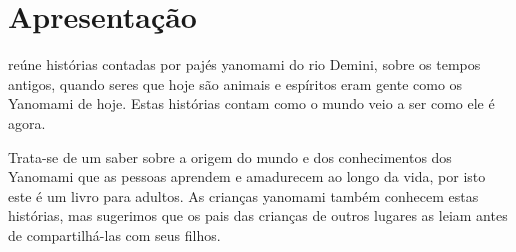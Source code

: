 
\chapter{Apresentação}

 reúne histórias contadas por pajés yanomami do rio Demini, sobre os tempos antigos, quando seres que hoje são animais e espíritos eram gente como os Yanomami de hoje. Estas histórias contam como o mundo veio a ser como ele é agora. 

Trata-se de um saber sobre a origem do mundo e dos conhecimentos dos Yanomami que as pessoas aprendem e amadurecem ao longo da vida, por isto este é um livro para adultos. As crianças yanomami também conhecem estas histórias, mas sugerimos que os pais das crianças de outros lugares as leiam antes de compartilhá-las com seus filhos.
